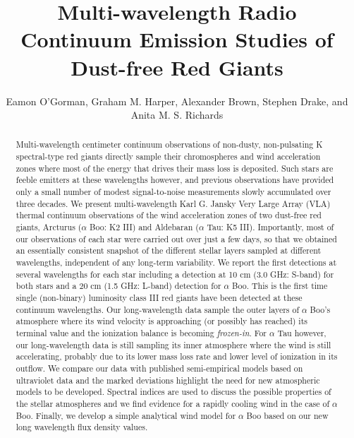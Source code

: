 \documentclass[iop]{emulateapj}
\begin{document}
\title{Multi-wavelength Radio Continuum Emission Studies of Dust-free Red Giants}


\author{Eamon O'Gorman, Graham M. Harper, Alexander Brown, Stephen Drake, and Anita M. S. Richards}



\begin{abstract}

Multi-wavelength centimeter continuum observations of non-dusty, non-pulsating K spectral-type red giants directly sample their chromospheres and wind acceleration zones where most of the energy that drives their mass loss is deposited. Such stars are feeble emitters at these wavelengths however, and previous observations have provided only a small number of modest signal-to-noise measurements slowly accumulated over three decades. We present multi-wavelength Karl G. Jansky Very Large Array (VLA) thermal continuum observations of the wind acceleration zones of two dust-free red giants, Arcturus ($\alpha$ Boo: K2 III) and Aldebaran ($\alpha$ Tau: K5 III). Importantly, most of our observations of each star were carried out over just a few days, so that we obtained an essentially consistent snapshot of the different stellar layers sampled at different wavelengths, independent of any long-term variability. We report the first detections at several wavelengths for each star including a detection at 10 cm (3.0 GHz: S-band) for both stars and a 20 cm (1.5 GHz: L-band) detection for $\alpha$ Boo. This is the first time single (non-binary) luminosity class III red giants have been detected at these continuum wavelengths. Our long-wavelength data sample the outer layers of $\alpha$ Boo's atmosphere where its wind velocity is approaching (or possibly has reached) its terminal value and the ionization balance is becoming \textit{frozen-in}. For $\alpha$ Tau however, our long-wavelength data is still sampling its inner atmosphere where the wind is still accelerating, probably due to its lower mass loss rate and lower level of ionization in its outflow. We compare our data with published semi-empirical models based on ultraviolet data and the marked deviations highlight the need for new atmospheric models to be developed. Spectral indices are used to discuss the possible properties of the stellar atmospheres and we find evidence for a rapidly cooling wind in the case of $\alpha$ Boo. Finally, we develop a simple analytical wind model for $\alpha$ Boo based on our new long wavelength flux density values.

\end{abstract}
\end{document}
